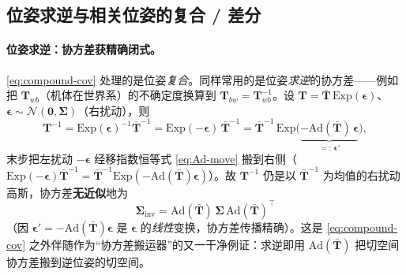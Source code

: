 \subsection{位姿求逆与相关位姿的复合 / 差分}
\label{subsec:correlated-pose}

\paragraph{位姿求逆：协方差获精确闭式。}\cref{eq:compound-cov} 处理的是位姿\emph{复合}。同样常用的是位姿\emph{求逆}的协方差——例如把 $\mathbf{T}_{wb}$（机体在世界系）的不确定度换算到 $\mathbf{T}_{bw}=\mathbf{T}_{wb}^{-1}$。设 $\mathbf{T}=\bar{\mathbf{T}}\,\mathrm{Exp}(\boldsymbol{\epsilon})$、$\boldsymbol{\epsilon}\sim\mathcal{N}(\mathbf{0},\boldsymbol{\Sigma})$（右扰动），则
\begin{equation}
  \mathbf{T}^{-1}=\mathrm{Exp}(\boldsymbol{\epsilon})^{-1}\bar{\mathbf{T}}^{-1}=\mathrm{Exp}(-\boldsymbol{\epsilon})\,\bar{\mathbf{T}}^{-1}
  =\bar{\mathbf{T}}^{-1}\,\mathrm{Exp}\big(\underbrace{-\mathrm{Ad}(\bar{\mathbf{T}})\,\boldsymbol{\epsilon}}_{=:\,\boldsymbol{\epsilon}'}\big),
  \label{eq:pose-inv-derivation}
\end{equation}
末步把左扰动 $-\boldsymbol{\epsilon}$ 经移指数恒等式 \cref{eq:Ad-move} 搬到右侧（$\mathrm{Exp}(-\boldsymbol{\epsilon})\bar{\mathbf{T}}^{-1}=\bar{\mathbf{T}}^{-1}\mathrm{Exp}(-\mathrm{Ad}(\bar{\mathbf{T}})\boldsymbol{\epsilon})$）。故 $\mathbf{T}^{-1}$ 仍是以 $\bar{\mathbf{T}}^{-1}$ 为均值的右扰动高斯，协方差\textbf{无近似}地为
\begin{equation}
  \boxed{\;\boldsymbol{\Sigma}_{\text{inv}}=\mathrm{Ad}(\bar{\mathbf{T}})\,\boldsymbol{\Sigma}\,\mathrm{Ad}(\bar{\mathbf{T}})^\top\;}
  \label{eq:pose-inverse-cov}
\end{equation}
（因 $\boldsymbol{\epsilon}'=-\mathrm{Ad}(\bar{\mathbf{T}})\boldsymbol{\epsilon}$ 是 $\boldsymbol{\epsilon}$ 的\emph{线性}变换，协方差传播精确）。这是 \cref{eq:compound-cov} 之外伴随作为“协方差搬运器”的又一干净例证：求逆即用 $\mathrm{Ad}(\bar{\mathbf{T}})$ 把切空间协方差搬到逆位姿的切空间。

